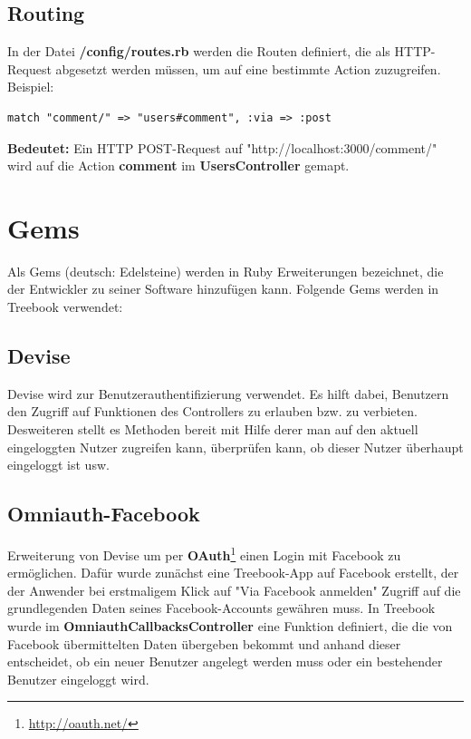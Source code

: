 \documentclass[10pt,a4paper]{book}
\begin{document}
\subsection{Routing}
In der Datei \textbf{/config/routes.rb} werden die Routen definiert, die als HTTP-Request abgesetzt werden müssen, um auf eine bestimmte Action zuzugreifen.
Beispiel:
\begin{lstlisting}
match "comment/" => "users#comment", :via => :post
\end{lstlisting}
\textbf{Bedeutet:} Ein HTTP POST-Request auf "http://localhost:3000/comment/" wird auf die Action \textbf{comment} im \textbf{UsersController} gemapt.
\section{Gems}
Als Gems (deutsch: Edelsteine) werden in Ruby Erweiterungen bezeichnet, die der Entwickler zu seiner Software hinzufügen kann. Folgende Gems werden in Treebook verwendet:
\subsection{Devise}
Devise wird zur Benutzerauthentifizierung verwendet. Es hilft dabei, Benutzern den Zugriff auf Funktionen des Controllers zu erlauben bzw. zu verbieten. Desweiteren stellt es Methoden bereit mit Hilfe derer man auf den aktuell eingeloggten Nutzer zugreifen kann, überprüfen kann, ob dieser Nutzer überhaupt eingeloggt ist usw.
\subsection{Omniauth-Facebook}
Erweiterung von Devise um per \textbf{OAuth}\footnote{\href{http://oauth.net/}{http://oauth.net/}} einen Login mit Facebook zu ermöglichen. 
Dafür wurde zunächst eine Treebook-App auf Facebook erstellt, der der Anwender bei erstmaligem Klick auf "Via Facebook anmelden" Zugriff auf 
die grundlegenden Daten seines Facebook-Accounts gewähren muss. In Treebook wurde im \textbf{OmniauthCallbacksController} eine Funktion 
definiert, die die von Facebook übermittelten Daten übergeben bekommt und anhand dieser entscheidet, ob ein neuer Benutzer angelegt werden muss oder ein bestehender Benutzer eingeloggt wird.
\end{document}

